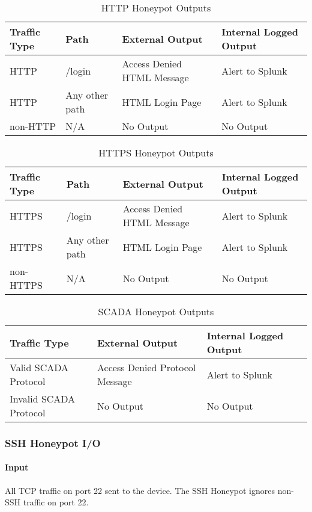 \begin{table}
\centering
\begin{tabular}{l l l l}
Traffic Type & Path & External Output & Internal Logged Output \\
\hline
HTTP & /login & Access Denied HTML Message & Alert to Splunk \\
HTTP & Any other path & HTML Login Page & Alert to Splunk \\
non-HTTP & N/A & No Output & No Output \\
\end{tabular}
\caption{HTTP Honeypot Outputs}
\label{table:http-output}
\end{table}

\begin{table}
\centering
\begin{tabular}{l l l l}
Traffic Type & Path & External Output & Internal Logged Output \\
\hline
HTTPS & /login & Access Denied HTML Message & Alert to Splunk \\
HTTPS & Any other path & HTML Login Page & Alert to Splunk \\
non-HTTPS & N/A & No Output & No Output \\
\end{tabular}
\caption{HTTPS Honeypot Outputs}
\label{table:https-output}
\end{table}

\begin{table}
\centering
\begin{tabular}{l l l l}
Traffic Type & External Output & Internal Logged Output \\
\hline
Valid SCADA Protocol & Access Denied Protocol Message & Alert to Splunk \\
Invalid SCADA Protocol & No Output & No Output \\
\end{tabular}
\caption{SCADA Honeypot Outputs}
\label{table:scada-output}
\end{table}

\subsubsection{SSH Honeypot I/O}

\paragraph{Input}

All TCP traffic on port 22 sent to the device. The SSH Honeypot ignores
non-SSH traffic on port 22.

